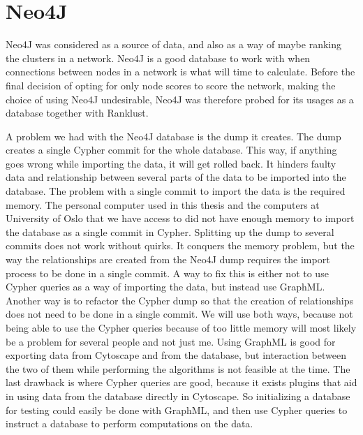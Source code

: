 \section{Neo4J}
Neo4J was considered as a source of data, and also as a way of maybe ranking the
clusters in a network. Neo4J is a good database to work with when connections
between nodes in a network is what will time to calculate. Before the
final decision of opting for only node scores to score the network, making the
choice of using Neo4J undesirable, Neo4J was therefore probed for its usages as
a database together with Ranklust.

A problem we had with the Neo4J\cite{neo4j} database is the dump it creates.
The dump creates a single Cypher\cite{cypher} commit for the whole database.
This way, if anything goes wrong while importing the data, it will get rolled
back. It hinders faulty data and relationship between several parts of the data
to be imported into the database. The problem with a single commit to import
the data is the required memory. The personal computer used in this thesis and
the computers at University of Oslo that we have access to did not have enough
memory to import the database as a single commit in Cypher. Splitting up the
dump to several commits does not work without quirks. It conquers the memory
problem, but the way the relationships are created from the Neo4J dump requires
the import process to be done in a single commit. A way to fix this is either
not to use Cypher queries as a way of importing the data, but instead use
GraphML\cite{graphml}. Another way is to refactor the Cypher dump so that the
creation of relationships does not need to be done in a single commit. We will
use both ways, because not being able to use the Cypher queries because of too
little memory will most likely be a problem for several people and not just me.
Using GraphML is good for exporting data from Cytoscape and from the database,
but interaction between the two of them while performing the algorithms is not
feasible at the time.  The last drawback is where Cypher queries are good,
because it exists plugins that aid in using data from the database directly in
Cytoscape. So initializing a database for testing could easily be done with
GraphML, and then use Cypher queries to instruct a database to perform
computations on the data.

